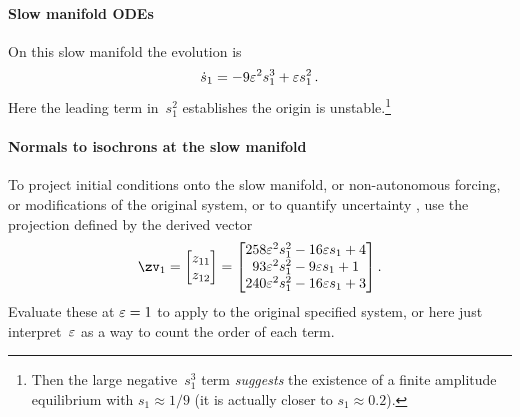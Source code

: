 \paragraph{Slow manifold ODEs} 
On this slow manifold the evolution is
\begin{equation*}
\dot s_{1}=-9 \varepsilon^{2} s_{1}^{3}+\varepsilon s_{1}^{2}\,.
\end{equation*}
Here the leading term in~\(s_1^2\) establishes the origin is unstable.\footnote{Then the large negative~\(s_1^3\) term \emph{suggests} the existence of a finite amplitude equilibrium with \(s_1\approx1/9\) (it is actually closer to \(s_1\approx 0.2\)).}


\paragraph{Normals to isochrons at the slow manifold}
To project initial conditions
onto the slow manifold, or non-autonomous
forcing, or modifications of the original system, or to quantify uncertainty \cite[]{Roberts89b, Roberts97b}, use the projection defined by the derived vector
\begin{equation*}
\zv_1=\begin{bmatrix}z_{11}\\z_{12}\end{bmatrix}
=\begin{bmatrix}
258 \eps^{2} s_{1}^{2}-16 \eps s_{1}+4
\\
93 \eps^{2} s_{1}^{2}-9 \eps s_{1}+1
\\
240 \eps^{2} s_{1}^{2}-16 \eps s_{1}+3
\end{bmatrix}.
\end{equation*}
Evaluate these at \(\varepsilon=1\) to apply to the original specified system, or here just interpret~\(\varepsilon\) as a way to count the order of each term.


